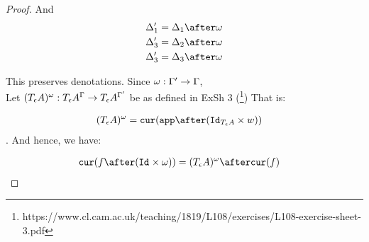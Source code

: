 \documentclass{report}
\begin{document}
\begin{framed}
\begin{proof}
            And 
            \begin{align*}
                \D_1' & =\D_1 \after \w\\
                \D_3' & =\D_2 \after \w\\
                \D_3' & =\D_3 \after \w 
            \end{align*}
        
        
            This preserves denotations.
            Since $\omega: \Gamma' \rightarrow \Gamma$, \\
            Let $(T_{\epsilon}{A})^{\omega}: T_{\epsilon}{A}^{\Gamma}\rightarrow T_{\epsilon}{A}^{\Gamma'}$ be as defined in ExSh 3 (\footnote{https://www.cl.cam.ac.uk/teaching/1819/L108/exercises/L108-exercise-sheet-3.pdf})
            That is:
        
            \begin{align*}
                (\tea)^{\w} & = \cur{\app\after(\Id{\tea}\times w)}
            \end{align*}.
            And hence, we have:
        
            \begin{align*}
                \cur{f\after(\Id{}\times \w)} & = (\tea)^{\w} \after\cur{f}
            \end{align*}
        

\end{proof}
\end{framed}
\end{document}

